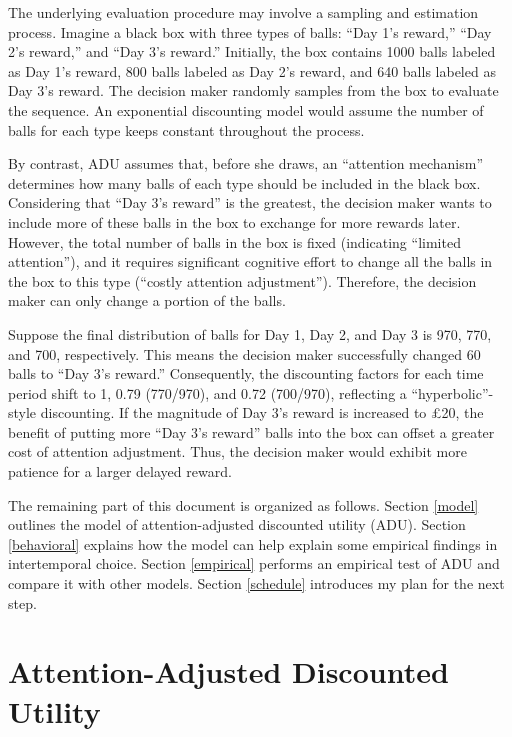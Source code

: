 \documentclass[
  12pt,
]{article}
\begin{document}
The underlying evaluation procedure may involve a sampling and
estimation process. Imagine a black box with three types of balls: ``Day
1's reward,'' ``Day 2's reward,'' and ``Day 3's reward.'' Initially, the
box contains 1000 balls labeled as Day 1's reward, 800 balls labeled as
Day 2's reward, and 640 balls labeled as Day 3's reward. The decision
maker randomly samples from the box to evaluate the sequence. An
exponential discounting model would assume the number of balls for each
type keeps constant throughout the process.

By contrast, ADU assumes that, before she draws, an ``attention
mechanism'' determines how many balls of each type should be included in
the black box. Considering that ``Day 3's reward'' is the greatest, the
decision maker wants to include more of these balls in the box to
exchange for more rewards later. However, the total number of balls in
the box is fixed (indicating ``limited attention''), and it requires
significant cognitive effort to change all the balls in the box to this
type (``costly attention adjustment''). Therefore, the decision maker
can only change a portion of the balls.

Suppose the final distribution of balls for Day 1, Day 2, and Day 3 is
970, 770, and 700, respectively. This means the decision maker
successfully changed 60 balls to ``Day 3's reward.'' Consequently, the
discounting factors for each time period shift to 1, 0.79 (770/970), and
0.72 (700/970), reflecting a ``hyperbolic''-style discounting. If the
magnitude of Day 3's reward is increased to £20, the benefit of putting
more ``Day 3's reward'' balls into the box can offset a greater cost of
attention adjustment. Thus, the decision maker would exhibit more
patience for a larger delayed reward.

The remaining part of this document is organized as follows. Section
\ref{model} outlines the model of attention-adjusted discounted utility
(ADU). Section \ref{behavioral} explains how the model can help explain
some empirical findings in intertemporal choice. Section \ref{empirical}
performs an empirical test of ADU and compare it with other models.
Section \ref{schedule} introduces my plan for the next step.

\hypertarget{attention-adjusted-discounted-utility}{%
\section{\texorpdfstring{Attention-Adjusted Discounted Utility
\label{model}}{Attention-Adjusted Discounted Utility }}\label{attention-adjusted-discounted-utility}}
\end{document}

